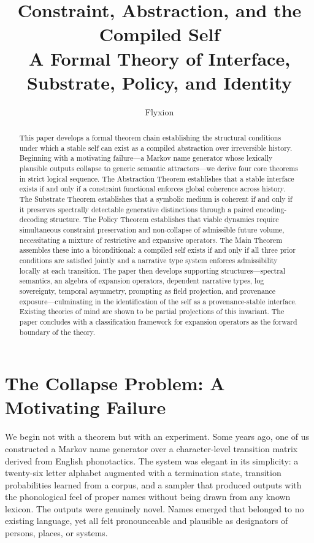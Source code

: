 \documentclass[12pt, a4paper]{article}
\title{\textbf{Constraint, Abstraction, and the Compiled Self}\\[0.5em]
\large A Formal Theory of Interface, Substrate, Policy, and Identity}
\author{Flyxion}
\date{}
\theoremstyle{plain}
\theoremstyle{definition}
\theoremstyle{remark}
\begin{document}
\maketitle

\begin{abstract}
This paper develops a formal theorem chain establishing the structural conditions under which a stable self can exist as a compiled abstraction over irreversible history. Beginning with a motivating failure---a Markov name generator whose lexically plausible outputs collapse to generic semantic attractors---we derive four core theorems in strict logical sequence. The Abstraction Theorem establishes that a stable interface exists if and only if a constraint functional enforces global coherence across history. The Substrate Theorem establishes that a symbolic medium is coherent if and only if it preserves spectrally detectable generative distinctions through a paired encoding-decoding structure. The Policy Theorem establishes that viable dynamics require simultaneous constraint preservation and non-collapse of admissible future volume, necessitating a mixture of restrictive and expansive operators. The Main Theorem assembles these into a biconditional: a compiled self exists if and only if all three prior conditions are satisfied jointly and a narrative type system enforces admissibility locally at each transition. The paper then develops supporting structures---spectral semantics, an algebra of expansion operators, dependent narrative types, log sovereignty, temporal asymmetry, prompting as field projection, and provenance exposure---culminating in the identification of the self as a provenance-stable interface. Existing theories of mind are shown to be partial projections of this invariant. The paper concludes with a classification framework for expansion operators as the forward boundary of the theory.
\end{abstract}

\tableofcontents
\newpage

\section{The Collapse Problem: A Motivating Failure}

We begin not with a theorem but with an experiment. Some years ago, one of us constructed a Markov name generator over a character-level transition matrix derived from English phonotactics. The system was elegant in its simplicity: a twenty-six letter alphabet augmented with a termination state, transition probabilities learned from a corpus, and a sampler that produced outputs with the phonological feel of proper names without being drawn from any known lexicon. The outputs were genuinely novel. Names emerged that belonged to no existing language, yet all felt pronounceable and plausible as designators of persons, places, or systems.
\end{document}
